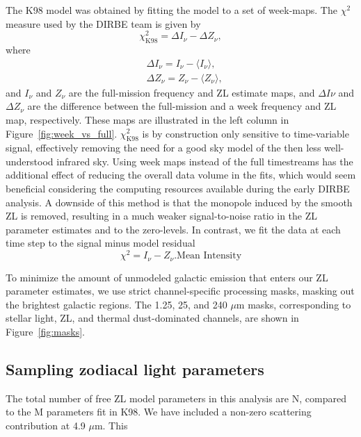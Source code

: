 \documentclass{aa}
\begin{document}
The K98 model was obtained by fitting the model to a set of week-maps. 
The $\chi^2$ measure used by the DIRBE team is given by
\begin{equation}
    \chi^2_\mathrm{K98} = \Delta I_\nu - \Delta Z_\nu,
\end{equation}
where
\begin{align}
    &\Delta I_\nu = I_\nu - \langle I_\nu \rangle,\\
    &\Delta Z_\nu = Z_\nu - \langle Z_\nu \rangle,
\end{align}
and $I_\nu$ and $Z_\nu$ are the full-mission frequency and ZL estimate 
maps, and $\Delta I\nu$ and $\Delta Z_\nu$ are the difference between 
the full-mission and a week frequency and ZL map, respectively. These 
maps are illustrated in the left column in Figure~\ref{fig:week_vs_full}. 
$\chi^2_\mathrm{K98}$ is by construction only sensitive to time-variable 
signal, effectively removing the need for a good sky model of the then 
less well-understood infrared sky. Using week maps instead of the full 
timestreams has the additional effect of reducing the overall data 
volume in the fits, which would seem beneficial considering the 
computing resources available during the early DIRBE analysis. A 
downside of this method is that the monopole induced by the smooth ZL is 
removed, resulting in a much weaker signal-to-noise ratio in the ZL 
parameter estimates and to the zero-levels. In contrast, we fit the data 
at each time step to the signal minus model residual
\begin{equation}\label{eq:chisq}
    \chi^2 = I_\nu - Z_\nu. \text{Mean Intensity}
\end{equation}

To minimize the amount of unmodeled galactic emission that enters our 
ZL parameter estimates, we use strict channel-specific processing masks, 
masking out the brightest galactic regions. The 1.25, 25, and 240 $\mu$m 
masks, corresponding to stellar light, ZL, and thermal dust-dominated 
channels, are shown in Figure~\ref{fig:masks}.


\subsection{Sampling zodiacal light parameters}
The total number of free ZL model parameters in this analysis are N, 
compared to the M parameters fit in K98. We have included a non-zero
scattering contribution at 4.9 $\mu$m. This 
\end{document}
